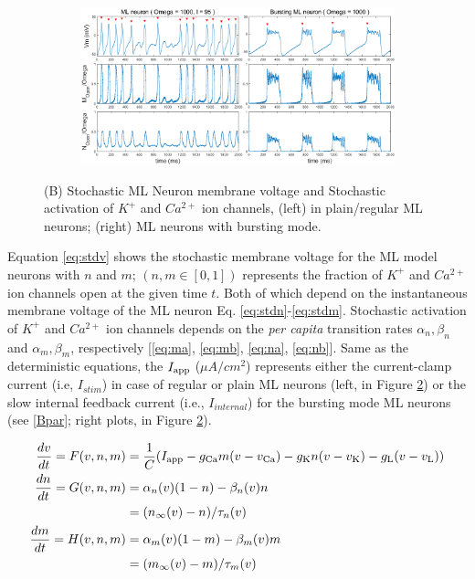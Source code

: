 \documentclass[
]{article}
\begin{document}
\begin{figure}    \ContinuedFloat
  \captionsetup[subfigure]{labelformat=empty} \centering
  \begin{subfigure}[b]{0.75\textwidth}
    \includegraphics[width=\textwidth]{figs/F0_B_ML_channel_stoch.png}
    \caption{} \label{fig:fig0st}
  \end{subfigure}
  \vspace{-0.75cm}
  \caption{(B) Stochastic ML Neuron membrane voltage and Stochastic activation of $K^+$ and $Ca^{2+}$ ion channels, (left) in plain/regular ML neurons; (right) ML neurons with bursting mode.}
\end{figure}

Equation \eqref{eq:stdv} shows the stochastic membrane voltage for the ML model neurons with \(n\) and \(m\); \((n,m \in [0,1])\) represents the fraction of \(K^+\) and \(Ca^{2+}\) ion channels open at the given time \(t\). Both of which depend on the instantaneous membrane voltage of the ML neuron Eq. \eqref{eq:stdn}-\eqref{eq:stdm}. Stochastic activation of \(K^+\) and \(Ca^{2+}\) ion channels depends on the \emph{per capita} transition rates \(\alpha_n,\beta_n\) and \(\alpha_m,\beta_m\), respectively {[}\eqref{eq:ma}, \eqref{eq:mb}, \eqref{eq:na}, \eqref{eq:nb}{]}. Same as the deterministic equations, the \(I_{\rm app}\) (\(\mu A/cm^2\)) represents either the current-clamp current (i.e, \(I_{stim}\)) in case of regular or plain ML neurons (left, in Figure \ref{fig:fig0st}) or the slow internal feedback current (i.e., \(I_{internal}\)) for the bursting mode ML neurons (see \ref{Bpar}; right plots, in Figure \ref{fig:fig0st}).

\begin{align} 
\label{eq:stdv} \frac{dv}{dt} = F(v,n,m) &= \frac1C ( I_{\rm app} - 
    g_{\rm Ca} m (v - v_{\rm Ca}) - g_{\rm K} n (v - v_{\rm K}) - 
    g_{\rm L}(v - v_{\rm L}) )
\\ \nonumber \frac{dn}{dt}  =  G(v,n, m) &= \alpha_n(v)(1-n) - \beta_n(v)n 
\\ \label{eq:stdn} &= (n_\infty(v)-n)/\tau_n(v)
\\ \nonumber \frac{dm}{dt}  =  H(v,n, m) &= \alpha_m(v)(1-m) - \beta_m(v)m 
\\ \label{eq:stdm} &= (m_\infty(v)-m)/\tau_m(v)
\end{align}
\end{document}
